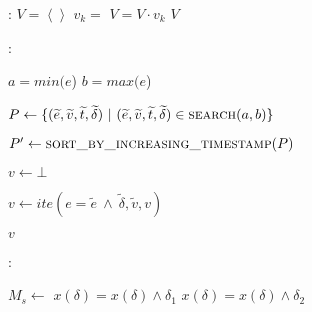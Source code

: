\documentclass{article}
\begin{document}
\begin{algorithm}

  \begin{algorithmic}[1]
	:
		\State $V = \left\langle \right\rangle$ 
			\State $v_k = $ 
			\State $V = V \cdot v_k$
		\EndFor
		\State \Return $V$
	\EndFunction
  \end{algorithmic}

  \bigskip

  \begin{algorithmic}[1]
	:

		\State $a = min(e$)
		\State $b = max(e$)

		\State $P \leftarrow \{ (\widetilde{e}, \widetilde{v}, \widetilde{t}, \widetilde{\delta})~|~(\widetilde{e}, \widetilde{v}, \widetilde{t}, \widetilde{\delta}) \in \Call{search}{a, b}\}$

		\State $P' \leftarrow \Call{sort\_by\_increasing\_timestamp}{P}$

		\State $v \leftarrow \bot$

			\State $v \leftarrow ite(e = \widetilde{e}~\wedge~\widetilde{\delta}, \widetilde{v}, v) $
		\EndFor

		\State \Return $v$
	\EndFunction
  \end{algorithmic}
  
  \bigskip

  \begin{algorithmic}[1]
	:

		\State $M_s \leftarrow $
			\State $x(\delta) = x(\delta) \wedge \delta_1$
			\State {}
		\EndFor
			\State $x(\delta) = x(\delta) \wedge \delta_2$
			\State {}
		\EndFor
	\EndFunction
  \end{algorithmic}

\end{algorithm}
\end{document}
